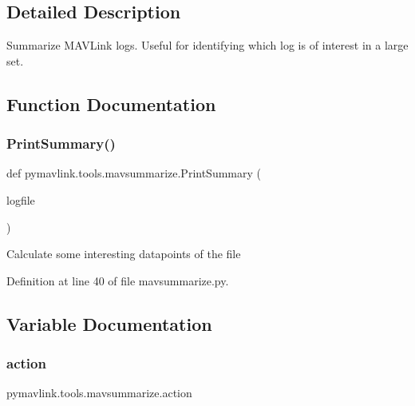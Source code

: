 \subsection{Detailed Description}
\begin{DoxyVerb}Summarize MAVLink logs. Useful for identifying which log is of interest in a large set.
\end{DoxyVerb}
 

\subsection{Function Documentation}
\mbox{\label{namespacepymavlink_1_1tools_1_1mavsummarize_a18c485920e60829977222cc4c514c590}} 
\subsubsection{\texorpdfstring{PrintSummary()}{PrintSummary()}}
{\footnotesize\ttfamily def pymavlink.\+tools.\+mavsummarize.\+Print\+Summary (\begin{DoxyParamCaption}\item[{}]{logfile }\end{DoxyParamCaption})}

\begin{DoxyVerb}Calculate some interesting datapoints of the file\end{DoxyVerb}
 

Definition at line 40 of file mavsummarize.\+py.



\subsection{Variable Documentation}
\mbox{\label{namespacepymavlink_1_1tools_1_1mavsummarize_afe96e367938157d5dda6785a259fd70d}} 
\subsubsection{\texorpdfstring{action}{action}}
{\footnotesize\ttfamily pymavlink.\+tools.\+mavsummarize.\+action}



